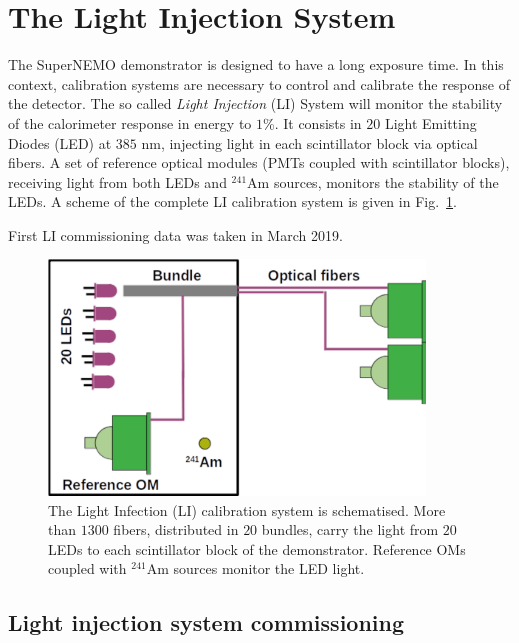 \section{The Light Injection System}
\label{sec:LIS}

The SuperNEMO demonstrator is designed to have a long exposure time.
In this context, calibration systems are necessary to control and calibrate the response of the detector.
The so called \emph{Light Injection} (LI) System will monitor the stability of the calorimeter response in energy to $1$\%.
It consists in $20$ Light Emitting Diodes (LED) at $385$ nm, injecting light in each scintillator block via optical fibers.
A set of reference optical modules (PMTs coupled with scintillator blocks), receiving light from both LEDs and $^{241}$Am sources, monitors the stability of the LEDs.
A scheme of the complete LI calibration system is given in Fig.~\ref{fig:LIS_scheme}.

First LI commissioning data was taken in March 2019.



\begin{figure}[h]
  \centering
  \includegraphics[width=10cm]{commissioning/fig_commissioning/LIS_scheme.pdf}
  \caption{The Light Infection (LI) calibration system is schematised.
    More than $1300$ fibers, distributed in $20$ bundles, carry the light from $20$ LEDs to each scintillator block of the demonstrator.
    Reference OMs coupled with $^{241}$Am sources monitor the LED light.
    \label{fig:LIS_scheme}}
\end{figure}

\subsection{Light injection system commissioning}


